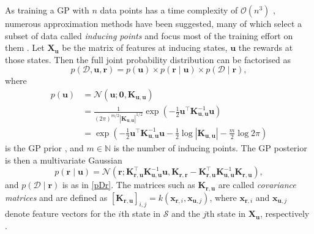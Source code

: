 \documentclass{mpaper}
\newcommand{\Kuu}{\mathbf{K}_{\mathbf{u},\mathbf{u}}}
\newcommand{\Krr}{\mathbf{K}_{\mathbf{r},\mathbf{r}}}
\newcommand{\Kru}{\mathbf{K}_{\mathbf{r},\mathbf{u}}}
\newcommand{\pfull}{p(\mathcal{D}, \mathbf{u}, \mathbf{r})}
\begin{document}
As training a GP with $n$ data points has a time complexity of
$\mathcal{O}(n^3)$ \cite{DBLP:books/lib/RasmussenW06}, numerous approximation
methods have been suggested, many of which select a subset of data called
\emph{inducing points} and focus most of the training effort on them
\cite{DBLP:journals/corr/abs-1807-01065}. Let $\mathbf{X_u}$ be the matrix of
features at inducing states, $\mathbf{u}$ the rewards at those states. Then the
full joint probability distribution can be factorised as
\begin{equation} \label{eq:full}
  \pfull = p(\mathbf{u}) \times p(\mathbf{r} \mid \mathbf{u}) \times
  p(\mathcal{D} \mid \mathbf{r}),
\end{equation}
where
\begin{align*}
  p(\mathbf{u}) &= \mathcal{N}(\mathbf{u}; \mathbf{0}, \Kuu) \\
                &= \frac{1}{(2\pi)^{m/2}|\Kuu|^{1/2}}\exp \left( -\frac{1}{2} \mathbf{u}^\intercal\Kuu^{-1}\mathbf{u} \right) \\
                &= \exp\left(-\frac{1}{2}\mathbf{u}^\intercal\Kuu^{-1}\mathbf{u} - \frac{1}{2}\log|\Kuu| - \frac{m}{2}\log 2\pi\right)
\end{align*}
is the GP prior \cite{DBLP:books/lib/RasmussenW06}, and $m \in \mathbb{N}$ is
the number of inducing points. The GP posterior is then a multivariate Gaussian
\cite{DBLP:conf/nips/LevinePK11}
\begin{equation} \label{eq:r}
  p(\mathbf{r} \mid \mathbf{u}) =
  \mathcal{N}(\mathbf{r}; \Kru^\intercal\Kuu^{-1}\mathbf{u}, \Krr - \Kru^\intercal\Kuu^{-1}\Kru),
\end{equation}
and $p(\mathcal{D} \mid \mathbf{r})$ is as in \eqref{pDr}. The matrices such as
$\Kru$ are called \emph{covariance matrices} and are defined as
$[\Kru]_{i,j} = k(\mathbf{x}_{\mathbf{r},i},
\mathbf{x}_{\mathbf{u},j})$, where $\mathbf{x}_{\mathbf{r},i}$ and
$\mathbf{x}_{\mathbf{u},j}$ denote feature vectors for the $i$th state in
$\mathcal{S}$ and the $j$th state in $\mathbf{X_u}$, respectively
\cite{DBLP:conf/uai/JinDAS17}.
\end{document}
